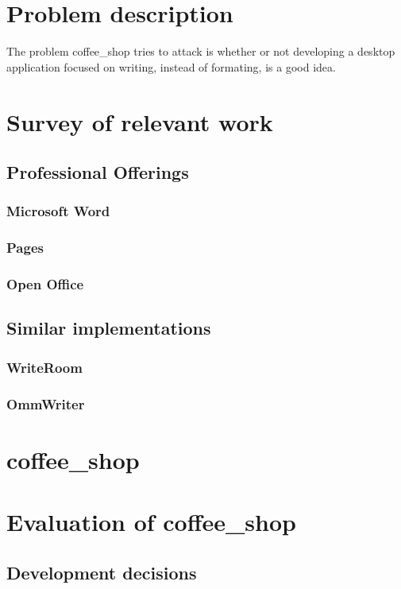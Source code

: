 \documentclass[11pt]{article}
\begin{document}
\section{Problem description}

The problem coffee\_shop tries to attack is whether or not developing a desktop application focused on writing, instead of formating, is a good idea.

\section{Survey of relevant work}
\subsection{Professional Offerings}

\subsubsection{Microsoft Word}
\subsubsection{Pages}
\subsubsection{Open Office}

\subsection{Similar implementations}

\subsubsection{WriteRoom}

\subsubsection{OmmWriter}

\section{coffee\_shop}

\section{Evaluation of coffee\_shop}
\subsection{Development decisions}
\end{document}
